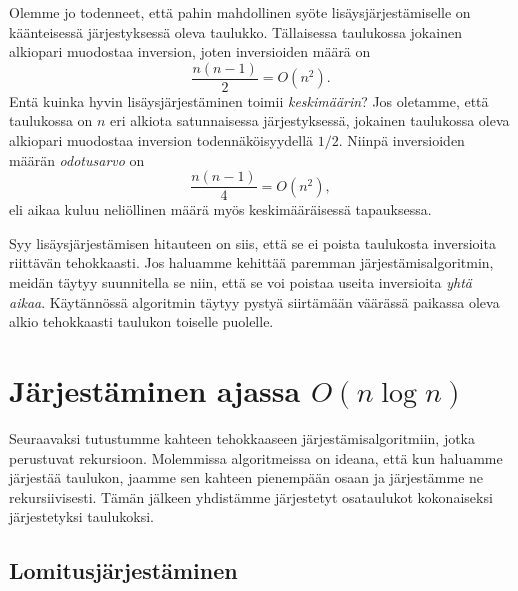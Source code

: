 Olemme jo todenneet, että pahin mahdollinen syöte
lisäysjärjestämiselle on käänteisessä järjestyksessä oleva taulukko.
Tällaisessa taulukossa jokainen alkiopari muodostaa inversion,
joten inversioiden määrä on
\[\frac{n(n-1)}{2}=O(n^2).\]
Entä kuinka hyvin lisäysjärjestäminen toimii \emph{keskimäärin}?
Jos oletamme, että taulukossa on $n$ eri alkiota satunnaisessa
järjestyksessä, jokainen taulukossa oleva alkiopari muodostaa
inversion todennäköisyydellä $1/2$.
Niinpä inversioiden määrän \emph{odotusarvo} on
\[\frac{n(n-1)}{4}=O(n^2),\]
eli aikaa kuluu neliöllinen määrä myös keskimääräisessä
tapauksessa.

Syy lisäysjärjestämisen hitauteen on siis,
että se ei poista taulukosta inversioita riittävän tehokkaasti.
Jos haluamme kehittää paremman järjestämis\-algoritmin,
meidän täytyy suunnitella se niin, että se voi poistaa
useita inversioita \emph{yhtä aikaa}.
Käytännössä algoritmin täytyy pystyä siirtämään
väärässä paikassa oleva alkio tehokkaasti taulukon
toiselle puolelle.

\section{Järjestäminen ajassa $O(n \log n)$}

Seuraavaksi tutustumme kahteen tehokkaaseen
järjestämisalgoritmiin, jotka perustuvat rekursioon.
Molemmissa algoritmeissa on ideana,
että kun haluamme järjestää taulukon,
jaamme sen kahteen pienempään osaan
ja järjestämme ne rekursiivisesti.
Tämän jälkeen yhdistämme järjestetyt osataulukot
kokonaiseksi järjestetyksi taulukoksi.

\subsection{Lomitusjärjestäminen}


